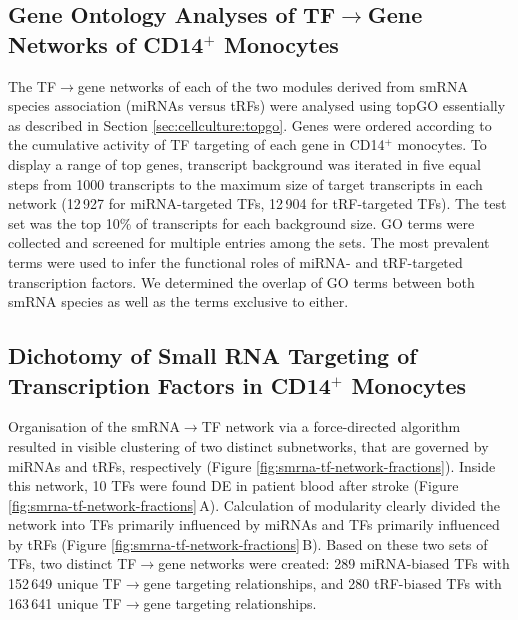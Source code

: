 \begin{method}
\subsection[Gene Ontology Analyses of TF$\to$Gene Networks\texorpdfstring{\\}{} of CD14$^+$ Monocytes]{Gene Ontology Analyses of TF$\to$Gene Networks of CD14$^+$ Monocytes} \label{sec:stroke:go-cd14}
The TF$\to$gene networks of each of the two modules derived from smRNA species association (miRNAs versus tRFs) were analysed using topGO\cite{Alexa2006} essentially as described in Section \ref{sec:cellculture:topgo}. Genes were ordered according to the cumulative activity of TF targeting of each gene in CD14$^+$ monocytes. To display a range of top genes, transcript background was iterated in five equal steps from 1000 transcripts to the maximum size of target transcripts in each network (12\,927 for miRNA-targeted TFs, 12\,904 for tRF-targeted TFs). The test set was the top 10\% of transcripts for each background size. GO terms were collected and screened for multiple entries among the sets. The most prevalent terms were used to infer the functional roles of miRNA- and tRF-targeted transcription factors. We determined the overlap of GO terms between both smRNA species as well as the terms exclusive to either. 

\end{method}

\subsection{Dichotomy of Small RNA Targeting of \\Transcription Factors in CD14$^+$ Monocytes}
Organisation of the smRNA$\to$TF network via a force-directed algorithm resulted in visible clustering of two distinct subnetworks, that are governed by miRNAs and tRFs, respectively (Figure \ref{fig:smrna-tf-network-fractions}). Inside this network, 10 TFs were found DE in patient blood after stroke (Figure \ref{fig:smrna-tf-network-fractions}\,A). Calculation of modularity clearly divided the network into TFs primarily influenced by miRNAs and TFs primarily influenced by tRFs (Figure \ref{fig:smrna-tf-network-fractions}\,B). Based on these two sets of TFs, two distinct TF$\to$gene networks were created: 289 miRNA-biased TFs with 152\,649 unique TF$\to$gene targeting relationships, and 280 tRF-biased TFs with 163\,641 unique TF$\to$gene targeting relationships.

